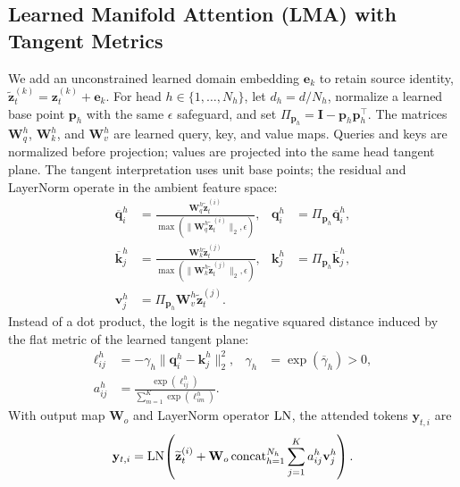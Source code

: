 \subsection{Learned Manifold Attention (LMA) with Tangent Metrics}
We add an unconstrained learned domain embedding $\mathbf e_k$ to retain source identity, $\widetilde{\mathbf z}_t^{(k)}=\mathbf z_t^{(k)}+\mathbf e_k$. For head $h\in\{1,\ldots,N_h\}$, let $d_h=d/N_h$, normalize a learned base point $\mathbf p_h$ with the same $\epsilon$ safeguard, and set $\Pi_{\mathbf p_h}=\mathbf I-\mathbf p_h\mathbf p_h^\top$. The matrices $\mathbf W_q^h$, $\mathbf W_k^h$, and $\mathbf W_v^h$ are learned query, key, and value maps. Queries and keys are normalized before projection; values are projected into the same head tangent plane. The tangent interpretation uses unit base points; the residual and LayerNorm operate in the ambient feature space:
\begin{equation}
\begin{aligned}
\overline{\mathbf q}_i^h&=\frac{\mathbf W_q^h\widetilde{\mathbf z}_t^{(i)}}
{\max(\|\mathbf W_q^h\widetilde{\mathbf z}_t^{(i)}\|_2,\epsilon)},
&\mathbf q_i^h&=\Pi_{\mathbf p_h}\overline{\mathbf q}_i^h,\\
\overline{\mathbf k}_j^h&=\frac{\mathbf W_k^h\widetilde{\mathbf z}_t^{(j)}}
{\max(\|\mathbf W_k^h\widetilde{\mathbf z}_t^{(j)}\|_2,\epsilon)},
&\mathbf k_j^h&=\Pi_{\mathbf p_h}\overline{\mathbf k}_j^h,\\
\mathbf v_j^h&=\Pi_{\mathbf p_h}\mathbf W_v^h\widetilde{\mathbf z}_t^{(j)}.
\end{aligned}
\label{eq:qkv}
\end{equation}
Instead of a dot product, the logit is the negative squared distance induced by the flat metric of the learned tangent plane:
\begin{align}
\ell_{ij}^h&=-\gamma_h\|\mathbf q_i^h-\mathbf k_j^h\|_2^2,
&\gamma_h&=\exp(\overline\gamma_h)>0,
\label{eq:attention-logit}\\
a_{ij}^h&=\frac{\exp(\ell_{ij}^h)}{\sum_{m=1}^{K}\exp(\ell_{im}^h)}.
\label{eq:attention-weight}
\end{align}
With output map $\mathbf W_o$ and LayerNorm operator $\operatorname{LN}$, the attended tokens $\mathbf y_{t,i}$ are
\begin{equation}
\mathbf y_{t,i}=\operatorname{LN}\!\left(\widetilde{\mathbf z}_t^{(i)}+
\mathbf W_o\operatorname{concat}_{h=1}^{N_h}
\sum_{j=1}^{K}a_{ij}^h\mathbf v_j^h\right).
\label{eq:attention-output}
\end{equation}

